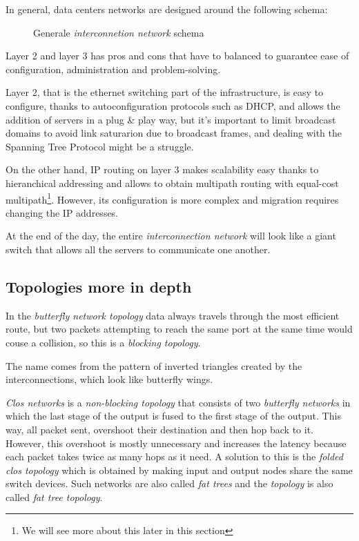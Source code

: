 \bigskip\noindent
In general, data centers networks are designed around the following schema:
\begin{figure}[h!]
    \centering
    \caption{Generale \emph{interconnetion network} schema}
\end{figure}

\noindent
Layer 2 and layer 3 has pros and cons that have to balanced to guarantee ease
of configuration, administration and problem-solving.

Layer 2, that is the ethernet switching part of the infrastructure, is easy to
configure, thanks to autoconfiguration protocols such as DHCP, and allows the
addition of servers in a plug \& play way, but it's important to limit broadcast
domains to avoid link saturarion due to broadcast frames, and dealing with the
Spanning Tree Protocol might be a struggle.

On the other hand, IP routing on layer 3 makes scalability easy thanks to
hieranchical addressing and allows to obtain multipath routing with equal-cost
multipath\footnote{We will see more about this later in this section}. However,
its configuration is more complex and migration requires changing the IP addresses.

\begin{note}
    At the end of the day, the entire \emph{interconnection network} will look
    like a giant switch that allows all the servers to communicate one another.
\end{note}

\subsection{Topologies more in depth}
In the \emph{butterfly network topology} data always travels through the most
efficient route, but two packets attempting to reach the same port at the same
time would couse a collision, so this is a \emph{blocking topology}.
\begin{note}
    The name comes from the pattern of inverted triangles created by the
    interconnections, which look like butterfly wings.
\end{note}
\emph{Clos networks} is a \emph{non-blocking topology} that consists of two
\emph{butterfly networks} in which the last stage of the output is fused to the
first stage of the output. This way, all packet sent, overshoot their destination
and then hop back to it. However, this overshoot is mostly unnecessary and
increases the latency because each packet takes twice as many hops as it need.
A solution to this is the \emph{folded clos topology} which is obtained by
making input and output nodes share the same switch devices. Such networks are
also called \emph{fat trees} and the \emph{topology} is also called
\emph{fat tree topology}.

